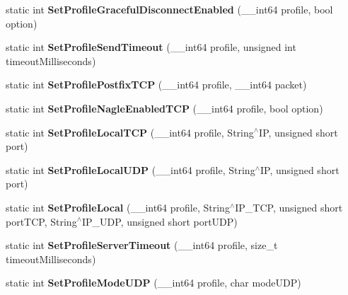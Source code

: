 \begin{DoxyCompactItemize}
\item 
\hypertarget{structmn_c_l_r_a1a479a4d68831ed6ee4154ec1b236622}{
static int {\bfseries SetProfileGracefulDisconnectEnabled} (\_\-\_\-int64 profile, bool option)}
\label{structmn_c_l_r_a1a479a4d68831ed6ee4154ec1b236622}

\item 
\hypertarget{structmn_c_l_r_a4327eaf2d4e3c7ba4149589226211f80}{
static int {\bfseries SetProfileSendTimeout} (\_\-\_\-int64 profile, unsigned int timeoutMilliseconds)}
\label{structmn_c_l_r_a4327eaf2d4e3c7ba4149589226211f80}

\item 
\hypertarget{structmn_c_l_r_a24d4459afcc6b5cbc3d6f980812a9b58}{
static int {\bfseries SetProfilePostfixTCP} (\_\-\_\-int64 profile, \_\-\_\-int64 packet)}
\label{structmn_c_l_r_a24d4459afcc6b5cbc3d6f980812a9b58}

\item 
\hypertarget{structmn_c_l_r_a01e08654d6776cde6da3cbe03bfa8148}{
static int {\bfseries SetProfileNagleEnabledTCP} (\_\-\_\-int64 profile, bool option)}
\label{structmn_c_l_r_a01e08654d6776cde6da3cbe03bfa8148}

\item 
\hypertarget{structmn_c_l_r_ac428d7b6080141585d994a0a3353d8fa}{
static int {\bfseries SetProfileLocalTCP} (\_\-\_\-int64 profile, String$^\wedge$IP, unsigned short port)}
\label{structmn_c_l_r_ac428d7b6080141585d994a0a3353d8fa}

\item 
\hypertarget{structmn_c_l_r_a5c66dd5a0c4907c46d3dd5a79b5f8bc4}{
static int {\bfseries SetProfileLocalUDP} (\_\-\_\-int64 profile, String$^\wedge$IP, unsigned short port)}
\label{structmn_c_l_r_a5c66dd5a0c4907c46d3dd5a79b5f8bc4}

\item 
\hypertarget{structmn_c_l_r_a34b437d28e4100e817b7a47e462a8d20}{
static int {\bfseries SetProfileLocal} (\_\-\_\-int64 profile, String$^\wedge$IP\_\-TCP, unsigned short portTCP, String$^\wedge$IP\_\-UDP, unsigned short portUDP)}
\label{structmn_c_l_r_a34b437d28e4100e817b7a47e462a8d20}

\item 
\hypertarget{structmn_c_l_r_a8837ee404af4025950cc1c2973e64018}{
static int {\bfseries SetProfileServerTimeout} (\_\-\_\-int64 profile, size\_\-t timeoutMilliseconds)}
\label{structmn_c_l_r_a8837ee404af4025950cc1c2973e64018}

\item 
\hypertarget{structmn_c_l_r_ae0fd3f03a47cb9ca56cc785a4a75e06a}{
static int {\bfseries SetProfileModeUDP} (\_\-\_\-int64 profile, char modeUDP)}
\label{structmn_c_l_r_ae0fd3f03a47cb9ca56cc785a4a75e06a}


\end{DoxyCompactItemize}
